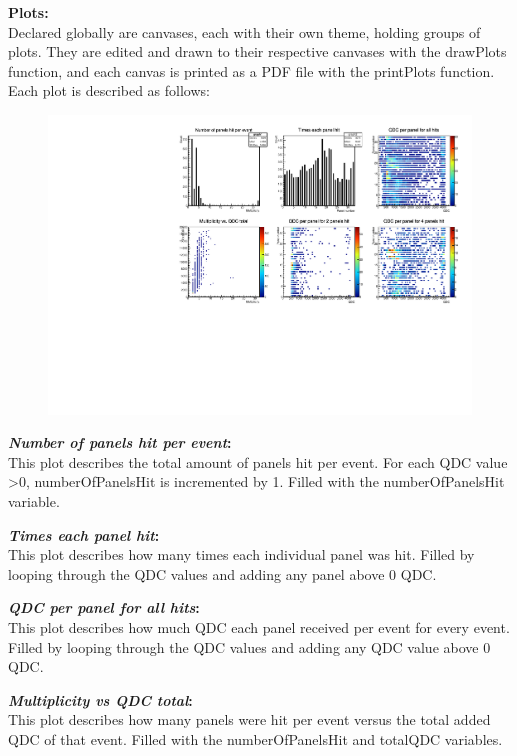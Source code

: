 \documentclass[a4paper,12pt]{article}
\begin{document}
\pagebreak

\textbf{Plots:} \\
Declared globally are canvases, each with their own theme, holding groups of plots. They are edited and drawn to their respective canvases with the drawPlots function, and each canvas is printed as a PDF file with the printPlots function. Each plot is described as follows: \\

\begin{figure}[h]
\centering
\includegraphics[scale=0.8]{graphs.pdf}
\end{figure}

\textbf{\emph{Number of panels hit per event}:}  \\
This plot describes the total amount of panels hit per event. For each QDC value >0, numberOfPanelsHit is incremented by 1. Filled with the numberOfPanelsHit variable.

\textbf{\emph{Times each panel hit}:} \\
This plot describes how many times each individual panel was hit. Filled by looping through the QDC values and adding any panel above 0 QDC.

\textbf{\emph{QDC per panel for all hits}:} \\
This plot describes how much QDC each panel received per event for every event. Filled by looping through the QDC values and adding any QDC value above 0 QDC.

\textbf{\emph{Multiplicity vs QDC total}:} \\
This plot describes how many panels were hit per event versus the total added QDC of that event. Filled with the numberOfPanelsHit and totalQDC variables.
\end{document}
